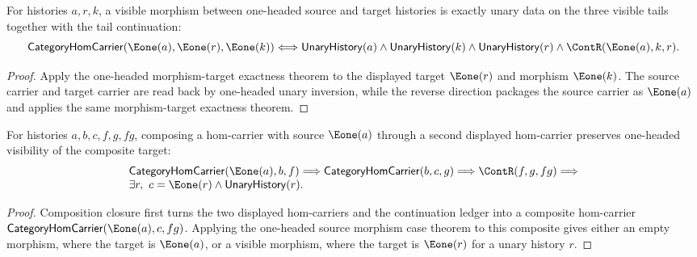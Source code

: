 \begin{theorem}
\label{thm:category-hom-carrier-e1-source-e1-target-visible-morphism-iff}
For histories $a,r,k$, a visible morphism between one-headed source and target
histories is exactly unary data on the three visible tails together with the
tail continuation:
$$
\mathsf{CategoryHomCarrier}(\Eone(a),\Eone(r),\Eone(k))
\Longleftrightarrow
\mathsf{UnaryHistory}(a)\wedge\mathsf{UnaryHistory}(k)\wedge
\mathsf{UnaryHistory}(r)\wedge\ContR(\Eone(a),k,r).
$$
\end{theorem}
\begin{proof}
Apply the one-headed morphism-target exactness theorem to the displayed target
$\Eone(r)$ and morphism $\Eone(k)$. The source carrier and target carrier are
read back by one-headed unary inversion, while the reverse direction packages
the source carrier as $\Eone(a)$ and applies the same morphism-target
exactness theorem.
\end{proof}

\begin{theorem}
\label{thm:category-hom-carrier-e1-source-comp-target-visible}
For histories $a,b,c,f,g,fg$, composing a hom-carrier with source $\Eone(a)$
through a second displayed hom-carrier preserves one-headed visibility of the
composite target:
$$
\begin{array}{l}
\mathsf{CategoryHomCarrier}(\Eone(a),b,f)\Longrightarrow
\mathsf{CategoryHomCarrier}(b,c,g)\Longrightarrow
\ContR(f,g,fg)\Longrightarrow
\\
\exists r,\ c=\Eone(r)\land\mathsf{UnaryHistory}(r).
\end{array}
$$
\end{theorem}
\begin{proof}
Composition closure first turns the two displayed hom-carriers and the
continuation ledger into a composite hom-carrier
$\mathsf{CategoryHomCarrier}(\Eone(a),c,fg)$. Applying the one-headed source
morphism case theorem to this composite gives either an empty morphism, where
the target is $\Eone(a)$, or a visible morphism, where the target is
$\Eone(r)$ for a unary history $r$.
\end{proof}
